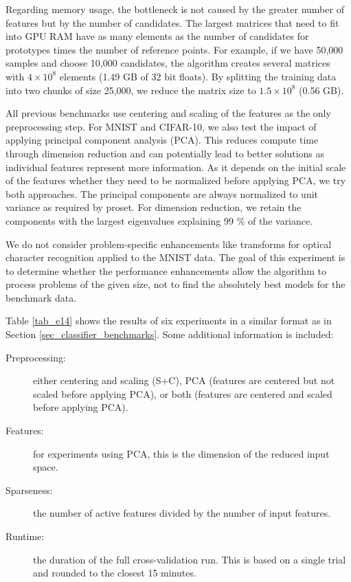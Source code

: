 %
Regarding memory usage, the bottleneck is not caused by the greater number of features but by the number of candidates.
The largest matrices that need to fit into GPU RAM have as many elements as the number of candidates for prototypes times the number of reference points.
For example, if we have 50,000 samples and choose 10,000 candidates, the algorithm creates several matrices with $4\times10^8$ elements (1.49 GB of 32 bit floats).
By splitting the training data into two chunks of size 25,000, we reduce the matrix size to $1.5\times10^8$ (0.56 GB).\par
%
All previous benchmarks use centering and scaling of the features as the only preprocessing step.
For MNIST and CIFAR-10, we also test the impact of applying principal component analysis (PCA).
This reduces compute time through dimension reduction and can potentially lead to better solutions as individual features represent more information.
As it depends on the initial scale of the features whether they need to be normalized before applying PCA, we try both approaches.
The principal components are always normalized to unit variance as required by proset.
For dimension reduction, we retain the components with the largest eigenvalues explaining 99 \% of the variance.
%
\begin{remark}
We do not consider problem-specific enhancements like transforms for optical character recognition applied to the MNIST data.
The goal of this experiment is to determine whether the performance enhancements allow the algorithm to process problems of the given size, not to find the absolutely best models for the benchmark data.
\end{remark}
%
Table \ref{tab_e14} shows the results of six experiments in a similar format as in Section \ref{sec_classifier_benchmarks}.
Some additional information is included:
%
\begin{description}
\item[Preprocessing:] either centering and scaling (S+C), PCA (features are centered but not scaled before applying PCA), or both (features are centered and scaled before applying PCA).
%
\item[Features:] for experiments using PCA, this is the dimension of the reduced input space.
%
\item[Sparseness:] the number of active features divided by the number of input features.
%
\item[Runtime:] the duration of the full cross-validation run.
This is based on a single trial and rounded to the closest 15 minutes.
\end{description}
